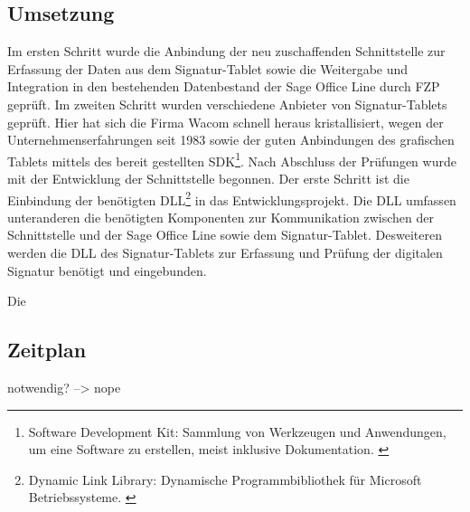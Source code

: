 \subsection{Umsetzung}
Im ersten Schritt wurde die Anbindung der neu zuschaffenden Schnittstelle zur Erfassung der Daten aus dem Signatur-Tablet sowie die Weitergabe und Integration in den bestehenden Datenbestand der Sage Office Line durch FZP geprüft. Im zweiten Schritt wurden verschiedene Anbieter von Signatur-Tablets geprüft. Hier hat sich die Firma Wacom schnell heraus kristallisiert, wegen der Unternehmenserfahrungen seit 1983 \cite{konzept1} sowie der guten Anbindungen des grafischen Tablets mittels des bereit gestellten SDK\footnote{\label{foot:4} Software Development Kit: Sammlung von Werkzeugen und Anwendungen, um eine Software zu erstellen, meist inklusive Dokumentation. \cite{SDK}}. Nach Abschluss der Prüfungen wurde mit der Entwicklung der Schnittstelle begonnen. Der erste Schritt ist die Einbindung der benötigten DLL\footnote{\label{foot:5} Dynamic Link Library: Dynamische Programmbibliothek für Microsoft Betriebssysteme. \cite{DLL}} in das Entwicklungsprojekt. Die DLL umfassen unteranderen die benötigten Komponenten zur Kommunikation zwischen der Schnittstelle und der Sage Office Line sowie dem Signatur-Tablet. Desweiteren werden die DLL des Signatur-Tablets zur Erfassung und Prüfung der digitalen Signatur benötigt und eingebunden.

Die 


\subsection{Zeitplan}
notwendig? --> nope 